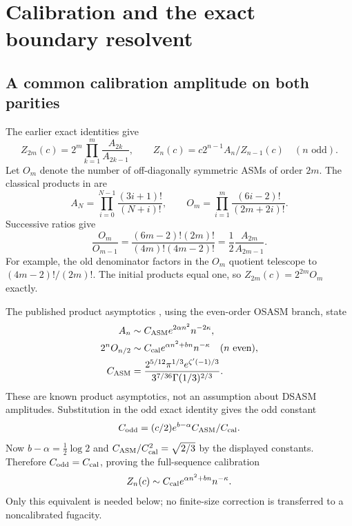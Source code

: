 \section{Calibration and the exact boundary resolvent}\label{sec:boundary}
\subsection{A common calibration amplitude on both parities}
The earlier exact identities give
\[
 Z_{2m}(c)=2^m\prod_{k=1}^m\frac{A_{2k}}{A_{2k-1}},\qquad
 Z_n(c)=c2^{n-1}A_n/Z_{n-1}(c)\quad(n\text{ odd}).
\]
Let $O_m$ denote the number of off-diagonally symmetric ASMs of
order $2m$. The classical products in \cite{bfk} are
\[
 A_N=\prod_{i=0}^{N-1}\frac{(3i+1)!}{(N+i)!},\qquad
 O_m=\prod_{i=1}^{m}\frac{(6i-2)!}{(2m+2i)!}.
\]
Successive ratios give
\[
 \frac{O_m}{O_{m-1}}
 =\frac{(6m-2)!(2m)!}{(4m)!(4m-2)!}
 =\frac12\frac{A_{2m}}{A_{2m-1}}.
\]
For example, the old denominator factors in the $O_m$ quotient
telescope to $(4m-2)!/(2m)!$. The initial products equal one,
so $Z_{2m}(c)=2^{2m}O_m$ exactly.

The published product asymptotics \cite[Equations (11.3)--(11.6)]{bfk},
using the even-order OSASM branch, state
\begin{align*}
 A_n&\sim C_{\rm ASM}e^{2\alpha n^2}n^{-2\kappa},\\
 2^nO_{n/2}&\sim C_{\rm cal}e^{\alpha n^2+bn}n^{-\kappa}
                    \quad(n\text{ even}),\\
 C_{\rm ASM}&=
 \frac{2^{5/12}\pi^{1/3}e^{\zeta'(-1)/3}}
      {3^{7/36}\Gamma(1/3)^{2/3}}.
\end{align*}
These are known product asymptotics, not an assumption about DSASM
amplitudes. Substitution in the odd exact identity gives the odd
constant
\[
 C_{\rm odd}=(c/2)e^{b-\alpha}C_{\rm ASM}/C_{\rm cal}.
\]
Now $b-\alpha=\tfrac12\log2$ and
$C_{\rm ASM}/C_{\rm cal}^2=\sqrt{2/3}$ by the displayed constants.
Therefore $C_{\rm odd}=C_{\rm cal}$, proving the full-sequence
calibration
\begin{equation}\label{calibrationequiv}
 Z_n(c)\sim C_{\rm cal}e^{\alpha n^2+bn}n^{-\kappa}.
\end{equation}
Only this equivalent is needed below; no finite-size correction is
transferred to a noncalibrated fugacity.

